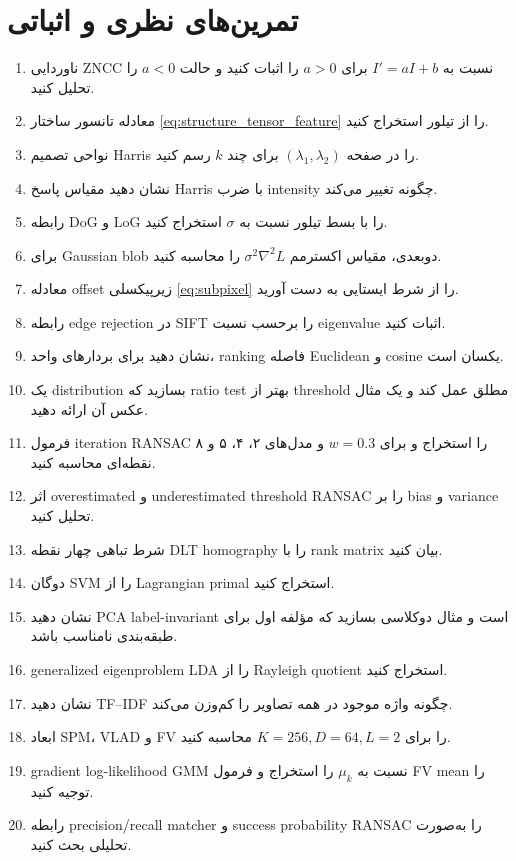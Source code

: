 \documentclass[12pt,openany,oneside]{book}
\begin{document}
\section{تمرین‌های نظری و اثباتی}
\begin{enumerate}
\item ناوردایی ZNCC نسبت به $I'=aI+b$ برای $a>0$ را اثبات کنید و حالت $a<0$ را تحلیل کنید.
\item معادله تانسور ساختار \eqref{eq:structure_tensor_feature} را از تیلور استخراج کنید.
\item نواحی تصمیم Harris را در صفحه $(\lambda_1,\lambda_2)$ برای چند $k$ رسم کنید.
\item نشان دهید مقیاس پاسخ Harris با ضرب intensity چگونه تغییر می‌کند.
\item رابطه DoG و LoG را با بسط تیلور نسبت به $\sigma$ استخراج کنید.
\item برای Gaussian blob دوبعدی، مقیاس اکسترمم $\sigma^2\nabla^2L$ را محاسبه کنید.
\item معادله offset زیرپیکسلی \eqref{eq:subpixel} را از شرط ایستایی به دست آورید.
\item رابطه edge rejection در SIFT را برحسب نسبت eigenvalue اثبات کنید.
\item نشان دهید برای بردارهای واحد، ranking فاصله Euclidean و cosine یکسان است.
\item یک distribution بسازید که ratio test بهتر از threshold مطلق عمل کند و یک مثال عکس آن ارائه دهید.
\item فرمول iteration RANSAC را استخراج و برای $w=0.3$ و مدل‌های ۲، ۴، ۵ و ۸ نقطه‌ای محاسبه کنید.
\item اثر overestimated و underestimated threshold RANSAC را بر bias و variance تحلیل کنید.
\item شرط تباهی چهار نقطه DLT homography را با rank matrix بیان کنید.
\item دوگان SVM را از Lagrangian primal استخراج کنید.
\item نشان دهید PCA label-invariant است و مثال دوکلاسی بسازید که مؤلفه اول برای طبقه‌بندی نامناسب باشد.
\item generalized eigenproblem LDA را از Rayleigh quotient استخراج کنید.
\item نشان دهید TF--IDF چگونه واژه موجود در همه تصاویر را کم‌وزن می‌کند.
\item ابعاد SPM، VLAD و FV را برای $K=256,D=64,L=2$ محاسبه کنید.
\item gradient log-likelihood GMM نسبت به $\mu_k$ را استخراج و فرمول FV mean را توجیه کنید.
\item رابطه precision/recall matcher و success probability RANSAC را به‌صورت تحلیلی بحث کنید.
\end{enumerate}
\end{document}
